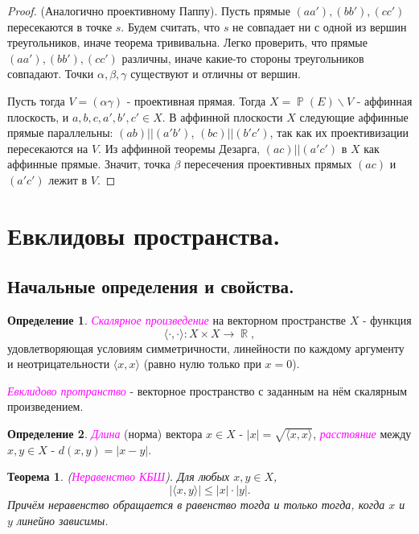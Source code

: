 \documentclass[a4paper,100pt]{article}
\theoremstyle{indented}
\newtheorem{theorem}{Теорема}
\theoremstyle{definition}
\newtheorem{defn}{Определение}
\theoremstyle{remark}
\DeclareMathOperator{\ra}{\rightarrow}
\DeclareMathOperator{\RR}{\mathbb{R}}
\DeclareMathOperator{\PP}{\mathbb{P}}
\begin{document}
\begin{proof}
    (Аналогично проективному Паппу). Пусть прямые $(aa'), (bb'), (cc')$ пересекаются в точке $s$. Будем считать, что $s$ не совпадает ни с одной из вершин треугольников, иначе теорема трививальна. Легко проверить, что прямые $(aa'), (bb'), (cc')$ различны, иначе какие-то стороны треугольников совпадают. Точки $\alpha, \beta, \gamma$ существуют и отличны от вершин. \ 
    
    Пусть тогда $V = (\alpha \gamma)$ - проективная прямая. Тогда $X = \PP(E) \backslash V$ - аффинная плоскость, и $a, b, c, a', b', c' \in X$. В аффинной плоскости $X$ следующие аффинные прямые параллельны: $(ab) || (a'b')$, $(bc) || (b'c')$, так как их проективизации пересекаются на $V$. Из аффинной теоремы Дезарга, $(ac) || (a'c')$ в $X$ как аффинные прямые. Значит, точка $\beta$ пересечения проективных прямых $(ac)$ и $(a'c')$ лежит в $V$. 
\end{proof}

\section{Евклидовы пространства.}

\subsection{Начальные определения и свойства.} 

\begin{defn}
    \textit{\textcolor{magenta}{\hypertarget{s53}{Скалярное произведение}}} на векторном пространстве $X$ - функция 
    \[
        \langle \cdot, \cdot \rangle: X\times X \ra \RR, 
    \]
    удовлетворяющая условиям симметричности, линейности по каждому аргументу и неотрицательности $\langle x, x \rangle$ (равно нулю только при $x=0$). \ 

    \textit{\textcolor{magenta}{\hypertarget{s54}{Евклидово протранство}}} - векторное пространство с заданным на нём скалярным произведением.
\end{defn}

\begin{defn}
    \textit{\textcolor{magenta}{\hypertarget{s55}{Длина}}} (норма) вектора $x \in X$ - $|x|=\sqrt{\langle x, x \rangle}$, \textit{\textcolor{magenta}{\hypertarget{s56}{расстояние}}} между $x, y\in X$ - $d(x, y)=|x-y|$.
\end{defn}

\begin{theorem}
    (\textit{\textcolor{magenta}{\hypertarget{s57}{Неравенство КБШ}}}). Для любых $x, y \in X$, 
    \[
        |\langle x, y \rangle|\leq |x|\cdot|y|. 
    \]
    Причём неравенство обращается в равенство тогда и только тогда, когда $x$ и $y$ линейно зависимы.
\end{theorem}
\end{document}
